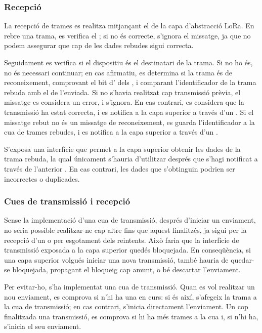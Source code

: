 \documentclass{tfgitic}[2024/07/01]
\begin{document}
\subsubsection{Recepció}
La recepció de trames es realitza mitjançant el  de la capa d'abstracció LoRa. En rebre una trama, es verifica el ; si no és correcte, s'ignora el missatge, ja que no podem assegurar que cap de les dades rebudes sigui correcta.

Seguidament es verifica si el dispositiu és el destinatari de la trama. Si no ho és, no és necessari continuar; en cas afirmatiu, es determina si la trama és de reconeixement, comprovant el bit d' dels , i comparant l'identificador de la trama rebuda amb el de l'enviada. Si no s'havia realitzat cap transmissió prèvia, el missatge es considera un error, i s'ignora. En cas contrari, es considera que la transmissió ha estat correcta, i es notifica a la capa superior a través d'un . Si el missatge rebut no és un missatge de reconeixement, es guarda l'identificador a la cua de trames rebudes, i es notifica a la capa superior a través d'un .

S'exposa una interfície que permet a la capa superior obtenir les dades de la trama rebuda, la qual únicament s'hauria d'utilitzar després que s'hagi notificat a través de l'anterior . En cas contrari, les dades que s'obtinguin podrien ser incorrectes o duplicades.
\subsubsection{Cues de transmissió i recepció}
Sense la implementació d'una cua de transmissió, després d'iniciar un enviament, no seria possible realitzar-ne cap altre fins que aquest finalitzés, ja sigui per la recepció d’un  o per esgotament dels reintents. Això faria que la interfície de transmissió exposada a la capa superior quedés bloquejada. En conseqüència, si una capa superior volgués iniciar una nova transmissió, també hauria de quedar-se bloquejada, propagant el bloqueig cap amunt, o bé descartar l’enviament.

Per evitar-ho, s'ha implementat una cua de transmissió. Quan es vol realitzar un nou enviament, es comprova si n'hi ha una en curs: si és així, s'afegeix la trama a la cua de transmissió; en cas contrari, s'inicia directament l'enviament. Un cop finalitzada una transmissió, es comprova si hi ha més trames a la cua i, si n'hi ha, s'inicia el seu enviament.
\end{document}
